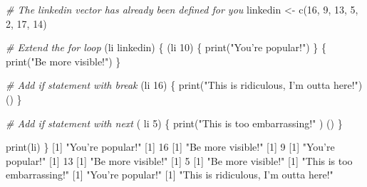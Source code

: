 \documentclass[]{article}
\newcommand{\hlnum}[1]{\textcolor[rgb]{0.816,0.125,0.439}{#1}}%
\newcommand{\hlstr}[1]{\textcolor[rgb]{0.251,0.627,0.251}{#1}}%
\newcommand{\hlcom}[1]{\textcolor[rgb]{0.502,0.502,0.502}{\textit{#1}}}%
\newcommand{\hlstd}[1]{\textcolor[rgb]{0.251,0.251,0.251}{#1}}%
\newcommand{\hlkwd}[1]{\textcolor[rgb]{0.878,0.439,0.125}{#1}}%
\newenvironment{Shaded}{\begin{myshaded}}{\end{myshaded}}
\newcommand{\KeywordTok}[1]{\hlkwd{#1}}
\newcommand{\DecValTok}[1]{\hlnum{#1}}
\newcommand{\StringTok}[1]{\hlstr{#1}}
\newcommand{\CommentTok}[1]{\hlcom{#1}}
\newcommand{\NormalTok}[1]{\hlstd{#1}}
\begin{document}
\begin{Shaded}
\begin{Highlighting}[]
\CommentTok{# The linkedin vector has already been defined for you}
\NormalTok{linkedin <-}\StringTok{ }\KeywordTok{c}\NormalTok{(}\DecValTok{16}\NormalTok{, }\DecValTok{9}\NormalTok{, }\DecValTok{13}\NormalTok{, }\DecValTok{5}\NormalTok{, }\DecValTok{2}\NormalTok{, }\DecValTok{17}\NormalTok{, }\DecValTok{14}\NormalTok{)}

\CommentTok{# Extend the for loop}
\NormalTok{ (li }\NormalTok{ linkedin) \{}
  \NormalTok{ (li }\OperatorTok{>}\StringTok{ }\DecValTok{10}\NormalTok{) \{}
    \KeywordTok{print}\NormalTok{(}\StringTok{"You're popular!"}\NormalTok{)}
\NormalTok{  \} }\NormalTok{ \{}
    \KeywordTok{print}\NormalTok{(}\StringTok{"Be more visible!"}\NormalTok{)}
\NormalTok{  \}}
  
  \CommentTok{# Add if statement with break}
  \NormalTok{(li }\OperatorTok{>}\StringTok{ }\DecValTok{16}\NormalTok{) \{}
    \KeywordTok{print}\NormalTok{(}\StringTok{"This is ridiculous, I'm outta here!"}\NormalTok{)}
    \NormalTok{()}
\NormalTok{  \}}
  
  \CommentTok{# Add if statement with next}
  \NormalTok{( li }\OperatorTok{<}\StringTok{ }\DecValTok{5}\NormalTok{) \{}
    \KeywordTok{print}\NormalTok{(}\StringTok{"This is too embarrassing!"}\NormalTok{ )}
    \NormalTok{()}
\NormalTok{  \}}
  
  \KeywordTok{print}\NormalTok{(li)}
\NormalTok{\}}
\NormalTok{   [}\DecValTok{1}\NormalTok{] }\StringTok{"You're popular!"}
\NormalTok{   [}\DecValTok{1}\NormalTok{] }\DecValTok{16}
\NormalTok{   [}\DecValTok{1}\NormalTok{] }\StringTok{"Be more visible!"}
\NormalTok{   [}\DecValTok{1}\NormalTok{] }\DecValTok{9}
\NormalTok{   [}\DecValTok{1}\NormalTok{] }\StringTok{"You're popular!"}
\NormalTok{   [}\DecValTok{1}\NormalTok{] }\DecValTok{13}
\NormalTok{   [}\DecValTok{1}\NormalTok{] }\StringTok{"Be more visible!"}
\NormalTok{   [}\DecValTok{1}\NormalTok{] }\DecValTok{5}
\NormalTok{   [}\DecValTok{1}\NormalTok{] }\StringTok{"Be more visible!"}
\NormalTok{   [}\DecValTok{1}\NormalTok{] }\StringTok{"This is too embarrassing!"}
\NormalTok{   [}\DecValTok{1}\NormalTok{] }\StringTok{"You're popular!"}
\NormalTok{   [}\DecValTok{1}\NormalTok{] }\StringTok{"This is ridiculous, I'm outta here!"}
\end{Highlighting}
\end{Shaded}
\end{document}
